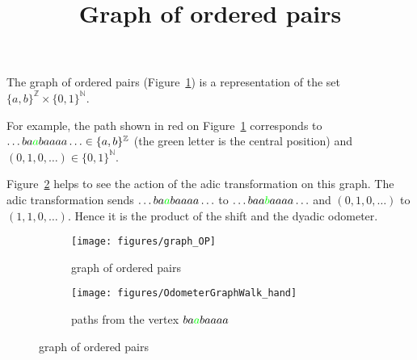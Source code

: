 \documentclass[12pt,a4paper]{article}
\title{Graph of ordered pairs}
\begin{document}
The graph of ordered pairs (Figure~\ref{fig:OPgraph}) is a representation of 
the set $\{a,b\}^{\mathbb{Z}} \times \{0,1\}^{\mathbb{N}}$. 

For example, the path shown in red on Figure~\ref{fig:OPgraph} corresponds 
to $\ldots ba{\color{green}a}baaaa\ldots \in \{a,b\}^{\mathbb{Z}}$ 
(the green letter is the central position) and 
$(0, 1, 0, \ldots) \in \{0,1\}^{\mathbb{N}}$.

Figure~\ref{fig:tree} helps to see the action of the adic transformation on this 
graph. 
The adic transformation sends 
$\ldots ba{\color{green}a}baaaa\ldots$ to $\ldots baa{\color{green}b}aaaa\ldots$ 
and $(0, 1, 0, \ldots)$ to $(1, 1, 0, \ldots)$. 
Hence it is the product of the shift and the dyadic odometer. 

\begin{figure}[!h]
   \centering
   \begin{subfigure}[b]{0.57\textwidth}
   \centering
   	\texttt{[image: figures/graph\_OP]}
 		\caption{\footnotesize graph of ordered pairs}\label{fig:OPgraph}
    \end{subfigure}              
   \quad
    \begin{subfigure}[b]{0.37\textwidth}
    \centering
   	\texttt{[image: figures/OdometerGraphWalk\_hand]}
 		\caption{\footnotesize paths from the vertex $ba{\color{green}a}baaaa$}\label{fig:tree}
 	\end{subfigure}      
   \caption{graph of ordered pairs}
   \label{fig:}
 \end{figure}


%
\end{document}
